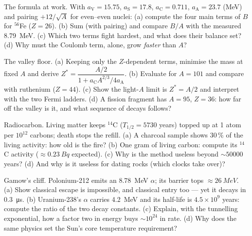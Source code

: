 \begin{exercise}[$\star\star$]\label{exo:b3:nuclear-physics:5}
The formula at work. With $a_{\text{V}} = 15.75$,
$a_{\text{S}} = 17.8$, $a_{\text{C}} = 0.711$,
$a_{\text{A}} = 23.7$ (\unit{MeV}) and pairing
$+12/\sqrt A$ for even--even nuclei: (a) compute the four main
terms of $B$ for $^{56}$Fe ($Z = 26$). (b) Sum (with pairing) and
compare $B/A$ with the measured \qty{8.79}{MeV}. (c) Which two
terms fight hardest, and what does their balance set? (d) Why
must the Coulomb term, alone, grow \emph{faster} than $A$?
\end{exercise}

\begin{exercise}[$\star\star$]\label{exo:b3:nuclear-physics:6}
The valley floor. (a) Keeping only the $Z$-dependent terms,
minimise the mass at fixed $A$ and derive
$Z^* = \dfrac{A/2}{1 + a_{\text{C}}A^{2/3}/4a_{\text{A}}}$. (b)
Evaluate for $A = 101$ and compare with ruthenium ($Z = 44$).
(c) Show the light-$A$ limit is $Z^* = A/2$ and interpret with
the two Fermi ladders. (d) A fission fragment has $A = 95$,
$Z = 36$: how far off the valley is it, and what sequence of
decays follows?
\end{exercise}

\begin{exercise}[$\star\star$]\label{exo:b3:nuclear-physics:7}
Radiocarbon. Living matter keeps $^{14}$C
($T_{1/2} = 5730$ years) topped up at 1 atom per $10^{12}$
carbons; death stops the refill. (a) A charcoal sample shows
30\,\% of the living activity: how old is the fire? (b) One gram
of living carbon: compute its $^{14}$C activity
($\approx\qty{0.23}{Bq}$ expected). (c) Why is the method useless
beyond $\sim\qty{50000}{}$ years? (d) And why is it useless for
dating rocks (which clocks take over)?
\end{exercise}

\begin{exercise}[$\star\star$]\label{exo:b3:nuclear-physics:8}
Gamow's cliff. Polonium-212 emits an \qty{8.78}{MeV} $\alpha$;
its barrier tops $\approx\qty{26}{MeV}$. (a) Show classical
escape is impossible, and classical entry too --- yet it decays
in \qty{0.3}{\micro s}. (b) Uranium-238's $\alpha$ carries
\qty{4.2}{MeV} and its half-life is $4.5\times10^9$ years:
compute the ratio of the two decay constants. (c) Explain, with
the tunnelling exponential, how a factor two in energy buys
$\sim10^{24}$ in rate. (d) Why does the same physics set the
Sun's core temperature requirement?
\end{exercise}

